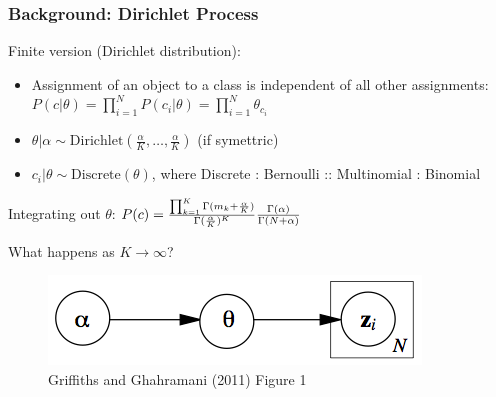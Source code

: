 \documentclass[13pt]{beamer}
\begin{document}
\begin{frame}
\frametitle{Background: Dirichlet Process}

Finite version (Dirichlet distribution):
\begin{itemize}
\item Assignment of an object to a class is independent of all other assignments: $P(c|\theta) = \prod_{i=1}^N P(c_i|\theta) = \prod_{i=1}^N \theta_{c_i}$
\item $\theta|\alpha \sim \text{Dirichlet}(\frac{\alpha}{K},\ldots,\frac{\alpha}{K})$ (if symettric)
\item $c_i|\theta \sim \text{Discrete}(\theta)$, where Discrete : Bernoulli :: Multinomial : Binomial
\end{itemize}

Integrating out $\theta$: $P(c) = { \prod_{k=1}^K \Gamma(m_k + \frac{\alpha}{K}) \over \Gamma(\frac{\alpha}{K})^K} {\Gamma(\alpha) \over \Gamma(N+\alpha)}$

What happens as $K \rightarrow \infty$?

\begin{figure}
\begin{center}
\includegraphics[scale=0.3]{./img/crp-graphical-model.png}
\caption{Griffiths and Ghahramani (2011) Figure 1}
\end{center}
\end{figure}

\end{frame}
\end{document}
